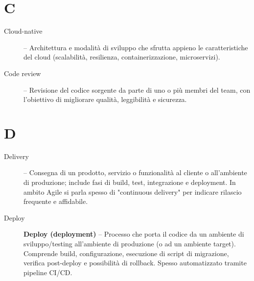 \section*{C}
\begin{description}
    \item[Cloud-native] -- Architettura e modalità di sviluppo che sfrutta appieno le caratteristiche del cloud (scalabilità, resilienza, containerizzazione, microservizi).
    \item[Code review] -- Revisione del codice sorgente da parte di uno o più membri del team, con l’obiettivo di migliorare qualità, leggibilità e sicurezza.
\end{description}

\section*{D}
\begin{description}
    \item[Delivery] -- Consegna di un prodotto, servizio o funzionalità al cliente o all'ambiente di produzione; include fasi di build, test, integrazione e deployment. In ambito Agile si parla spesso di "continuous delivery" per indicare rilascio frequente e affidabile.
    \item[Deploy] \textbf{Deploy (deployment)} -- Processo che porta il codice da un ambiente di sviluppo/testing all'ambiente di produzione (o ad un ambiente target). Comprende build, configurazione, esecuzione di script di migrazione, verifica post-deploy e possibilità di rollback. Spesso automatizzato tramite pipeline CI/CD.
\end{description}

